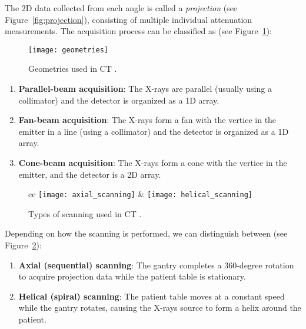 The 2D data collected from each angle is called a \emph{projection}
(see Figure~\ref{fig:projection}), consisting of multiple individual
attenuation measurements. The acquisition process can be classified as
(see Figure~\ref{fig:CT_geometries}):

\begin{figure}
  \centering
  \texttt{[image: geometries]}
  \caption{Geometries used in CT \cite{takase2025CT}.\label{fig:CT_geometries}}
\end{figure}

\begin{enumerate}
\item \textbf{Parallel-beam acquisition}: The X-rays are parallel
  (usually using a collimator) and the detector is organized as a 1D
  array.

\item \textbf{Fan-beam acquisition}: The X-rays form a fan with the vertice in the emitter
  in a line (using a collimator) and the detector is organized as a 1D
  array.

\item \textbf{Cone-beam acquisition}: The X-rays form a cone with the
  vertice in the emitter, and the detector is a 2D array.
  
\end{enumerate}

\begin{figure}
  \centering
  \begin{table}{cc}
    \texttt{[image: axial\_scanning]} & \texttt{[image: helical\_scanning]}
  \end{table}
  \caption{Types of scanning used in CT \cite{abdulla2025acquiring1}.\label{fig:scannings}}
\end{figure}

Depending on how the scanning is performed, we can distinguish between
(see Figure~\ref{fig:scannings}):

\begin{enumerate}
\item \textbf{Axial (sequential) scanning}:
  The gantry completes a 360-degree rotation to acquire projection
  data while the patient table is stationary. 

\item \textbf{Helical (spiral) scanning}: The patient table moves
  at a constant speed while the gantry rotates, causing the X-rays
  source to form a helix around the patient.
\end{enumerate}

